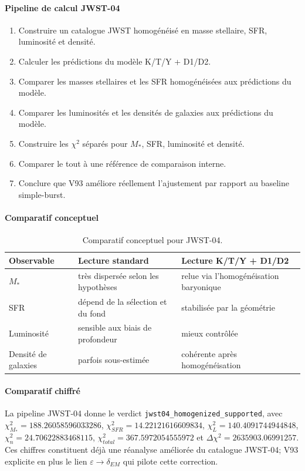 \documentclass[11pt,a4paper]{article}
\begin{document}
\paragraph{Pipeline de calcul JWST-04}
\begin{enumerate}[leftmargin=*,itemsep=0.2em,topsep=0.2em]
\item Construire un catalogue JWST homogénéisé en masse stellaire, SFR, luminosité et densité.
\item Calculer les prédictions du modèle K/T/Y + D1/D2.
\item Comparer les masses stellaires et les SFR homogénéisées aux prédictions du modèle.
\item Comparer les luminosités et les densités de galaxies aux prédictions du modèle.
\item Construire les $\chi^2$ séparés pour $M_*$, SFR, luminosité et densité.
\item Comparer le tout à une référence de comparaison interne.
\item Conclure que V93 améliore réellement l'ajustement par rapport au baseline simple-burst.
\end{enumerate}

\paragraph{Comparatif conceptuel}
\begin{table}[htbp]
\centering
\begin{tabular}{>{\raggedright\arraybackslash}p{4cm} >{\raggedright\arraybackslash}p{5.2cm} >{\raggedright\arraybackslash}p{5.2cm}}
\toprule
Observable & Lecture standard & Lecture K/T/Y + D1/D2 \\
\midrule
$M_*$ & très dispersée selon les hypothèses & relue via l'homogénéisation baryonique \\
SFR & dépend de la sélection et du fond & stabilisée par la géométrie \\
Luminosité & sensible aux biais de profondeur & mieux contrôlée \\
Densité de galaxies & parfois sous-estimée & cohérente après homogénéisation \\
\bottomrule
\end{tabular}
\caption{Comparatif conceptuel pour JWST-04.}
\end{table}

\paragraph{Comparatif chiffré}
La pipeline JWST-04 donne le verdict \texttt{jwst04\_homogenized\_supported}, avec $\chi^2_{M_*}=188.26058596033286$, $\chi^2_{SFR}=14.22121616609834$, $\chi^2_{L}=140.4091744944848$, $\chi^2_{n}=24.70622883468115$, $\chi^2_{total}=367.5972054555972$ et $\Delta\chi^2=2635903.06991257$.
Ces chiffres constituent déjà une réanalyse améliorée du catalogue JWST-04; V93 explicite en plus le lien $\varepsilon\rightarrow\delta_{EM}$ qui pilote cette correction.
\end{document}
